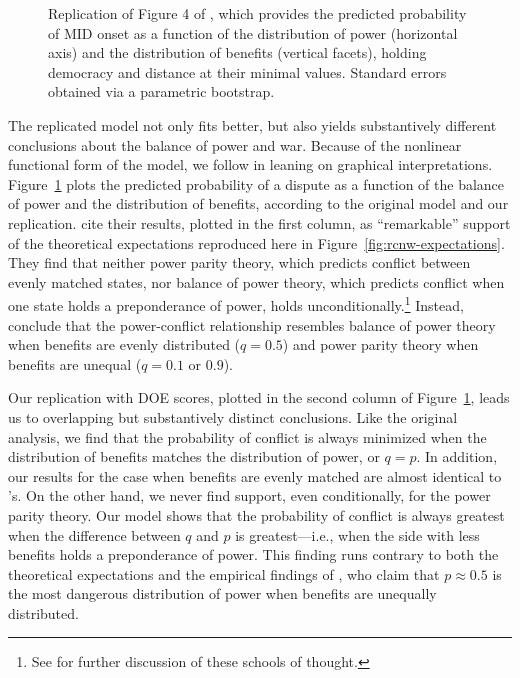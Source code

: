 \begin{figure}[tp]
  \centering
  
  \caption{
    Replication of Figure 4 of \citet[1213]{reed2008war}, which provides the predicted probability of MID onset as a function of the distribution of power (horizontal axis) and the distribution of benefits (vertical facets), holding democracy and distance at their minimal values.
    Standard errors obtained via a parametric bootstrap.
  }
  \label{fig:rcnw-gull}
\end{figure}

The replicated model not only fits better, but also yields substantively different conclusions about the balance of power and war.
Because of the nonlinear functional form of the model, we follow \citet{reed2008war} in leaning on graphical interpretations.
Figure~\ref{fig:rcnw-gull} plots the predicted probability of a dispute as a function of the balance of power and the distribution of benefits, according to the original model and our replication.
\citet[1212]{reed2008war} cite their results, plotted in the first column, as ``remarkable'' support of the theoretical expectations reproduced here in Figure~\ref{fig:rcnw-expectations}.
They find that neither power parity theory, which predicts conflict between evenly matched states, nor balance of power theory, which predicts conflict when one state holds a preponderance of power, holds unconditionally.\footnote{%
  See \citet[chapter~3]{powell1999} for further discussion of these schools of thought.
}
Instead, \citeauthor{reed2008war} conclude that the power-conflict relationship resembles balance of power theory when benefits are evenly distributed ($q = 0.5$) and power parity theory when benefits are unequal ($q = 0.1$ or $0.9$).

Our replication with DOE scores, plotted in the second column of Figure~\ref{fig:rcnw-gull}, leads us to overlapping but substantively distinct conclusions.
Like the original analysis, we find that the probability of conflict is always minimized when the distribution of benefits matches the distribution of power, or $q = p$.
In addition, our results for the case when benefits are evenly matched are almost identical to \citeauthor{reed2008war}'s.
On the other hand, we never find support, even conditionally, for the power parity theory.
Our model shows that the probability of conflict is always greatest when the difference between $q$ and $p$ is greatest---i.e., when the side with less benefits holds a preponderance of power.
This finding runs contrary to both the theoretical expectations and the empirical findings of \citeauthor{reed2008war}, who claim that $p \approx 0.5$ is the most dangerous distribution of power when benefits are unequally distributed.


